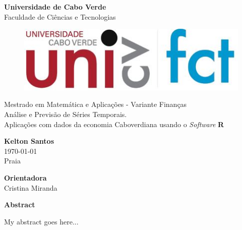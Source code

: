 \documentclass[
  openany]{book}
\author{}
\date{\vspace{-2.5em}}
\makeatletter
\newcommand\abstractname{Abstract}
\newenvironment{abstract}{%
      \titlepage
      \null\vfil
      \@beginparpenalty\@lowpenalty
      \begin{center}%
        \bfseries \abstractname
        \@endparpenalty\@M
      \end{center}}%
     {\par\vfil\null\endtitlepage}
\newenvironment{abstract}{%
      \if@twocolumn
        \section*{\abstractname}%
      \else
        \small
        \begin{center}%
          {\bfseries \abstractname\vspace{-.5em}\vspace{\z@}}%
        \end{center}%
        \quotation
      \fi}
      {\if@twocolumn\else\endquotation\fi}
\makeatother
\begin{document}
\begin{titlepage}
\begin{center}
\LARGE{\textbf{Universidade de Cabo Verde}}\\
\normalsize{Faculdade de Ciências e Tecnologias}\\[0.3cm]

\begin{figure}[h!]
    \centering
    \includegraphics[width=.3\linewidth]{img/hpi_logo.jpg}
\end{figure}
\vspace{4cm}

\LARGE{Mestrado em Matemática e Aplicações - Variante Finanças}\\[0.7cm]
\Huge{Análise e Previsão de Séries Temporais.\\ Aplicações com dados da economia Caboverdiana usando o \textit{Software} \textbf{R}}

\vspace{3cm} 

\Large{\textbf{Kelton Santos}} \\[3pt]  
\vspace{0.5cm}
\large{\today} \\
Praia

\vspace{1cm}

\large{\textbf{Orientadora}}\\
Cristina Miranda\\
\vspace{0.5cm}
\end{center}
\end{titlepage}


\thispagestyle{empty}


\begin{abstract}
My abstract goes here...
\end{abstract}

% 
% 

\setcounter{page}{1}
\end{document}
